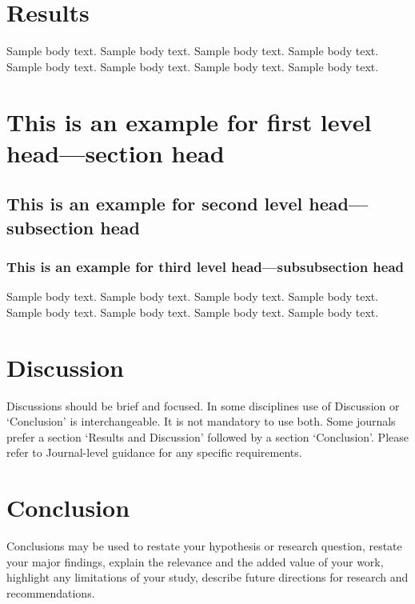 \documentclass[pdflatex,sn-apa]{sn-jnl}%
\begin{document}
\section{Results}\label{sec2}

Sample body text. Sample body text. Sample body text. Sample body text. Sample body text. Sample body text. Sample body text. Sample body text.

\section{This is an example for first level head---section head}\label{sec3}

\subsection{This is an example for second level head---subsection head}\label{subsec2}

\subsubsection{This is an example for third level head---subsubsection head}\label{subsubsec2}

Sample body text. Sample body text. Sample body text. Sample body text. Sample body text. Sample body text. Sample body text. Sample body text. 



\section{Discussion}\label{sec12}

Discussions should be brief and focused. In some disciplines use of Discussion or `Conclusion' is interchangeable. It is not mandatory to use both. Some journals prefer a section `Results and Discussion' followed by a section `Conclusion'. Please refer to Journal-level guidance for any specific requirements. 

\section{Conclusion}\label{sec13}

Conclusions may be used to restate your hypothesis or research question, restate your major findings, explain the relevance and the added value of your work, highlight any limitations of your study, describe future directions for research and recommendations. 
\end{document}
